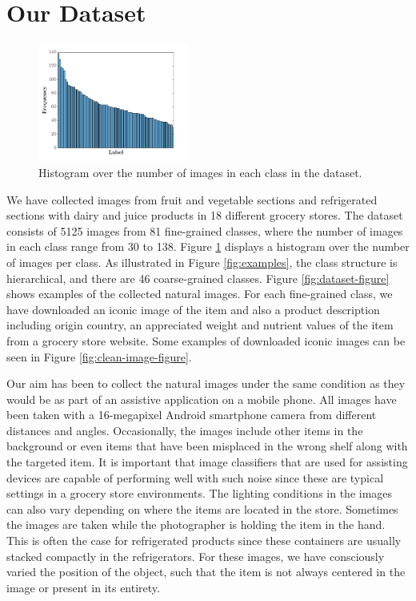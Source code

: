 \section{Our Dataset}\label{paperA:sec:our_dataset}

\begin{figure}
	\centering
	\includegraphics[width=0.44\textwidth, height=0.23\textwidth]{PaperA/figures/hist1_latex_bf14.png}
	\vspace{-6mm}
	\captionsetup{width=.88\linewidth}
	\caption{Histogram over the number of images in each class in the dataset.}
	\vspace{-2mm}
	\label{fig:hist}
\end{figure}
We have collected images from fruit and vegetable sections and refrigerated sections with dairy and juice products in 18 different grocery stores. The dataset consists of 5125 images from 81 fine-grained classes, where the number of images in each class range from 30 to 138. Figure \ref{fig:hist} displays a histogram over the number of images per class. As illustrated in Figure \ref{fig:examples}, the class structure is hierarchical, and there are 46 coarse-grained classes. Figure \ref{fig:dataset-figure} shows examples of the collected natural images. For each fine-grained class, we have downloaded an iconic image of the item and also a product description including origin country, an appreciated weight and nutrient values of the item from a grocery store website. Some examples of downloaded iconic images can be seen in Figure \ref{fig:clean-image-figure}. 

Our aim has been to collect the natural images under the same condition as they would be as part of an assistive application on a mobile phone. All images have been taken with a 16-megapixel Android smartphone camera from different distances and angles. Occasionally, the images include other items in the background or even items that have been misplaced in the wrong shelf along with the targeted item. It is important that image classifiers that are used for assisting devices are capable of performing well with such noise since these are typical settings in a grocery store environments. The lighting conditions in the images can also vary depending on where the items are located in the store. 
Sometimes the images are taken while the photographer is holding the item in the hand. This is often the case for refrigerated products since these containers are usually stacked compactly in the refrigerators. For these images, we have consciously varied the position of the object, such that the item is not always centered in the image or present in its entirety. 

